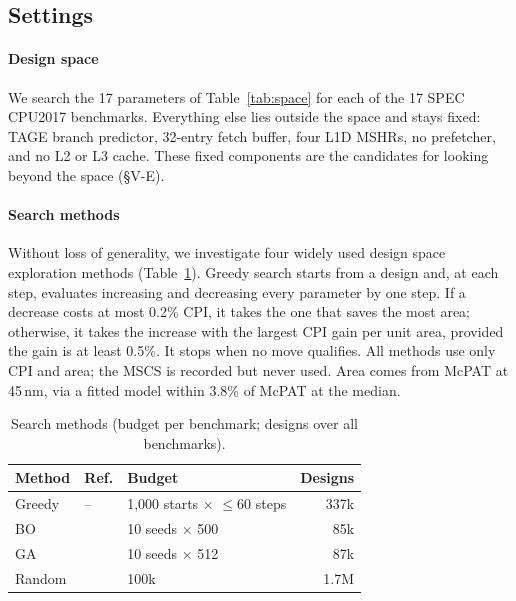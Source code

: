 
\subsection{Settings}
\label{sec:char_settings}

\paragraph{Design space}
We search the 17 parameters of Table~\ref{tab:space} for each of the 17 SPEC CPU2017 benchmarks.
%
Everything else lies outside the space and stays fixed: TAGE branch predictor, 32-entry fetch buffer, four L1D MSHRs, no prefetcher, and no L2 or L3 cache.
%
These fixed components are the candidates for looking beyond the space (\S V-E).

\paragraph{Search methods}
Without loss of generality, we investigate four widely used design space exploration methods (Table~\ref{tab:char_methods}).
%
Greedy search starts from a design and, at each step, evaluates increasing and decreasing every parameter by one step.
%
If a decrease costs at most 0.2\% CPI, it takes the one that saves the most area; otherwise, it takes the increase with the largest CPI gain per unit area, provided the gain is at least 0.5\%.
%
It stops when no move qualifies.
%
All methods use only CPI and area; the MSCS is recorded but never used.
%
Area comes from McPAT at 45\,nm, via a fitted model within 3.8\% of McPAT at the median.

\begin{table}[t]
\centering
\caption{Search methods (budget per benchmark; designs over all benchmarks).}
\label{tab:char_methods}
\footnotesize
\setlength{\tabcolsep}{4pt}
\begin{tabular}{lll r}
\toprule
Method & Ref. & Budget & Designs \\
\midrule
Greedy & -- & 1,000 starts $\times$ $\leq$60 steps & 337k \\
BO & \cite{bo} & 10 seeds $\times$ 500 & 85k \\
GA & \cite{archgym} & 10 seeds $\times$ 512 & 87k \\
Random & \cite{archgym} & 100k & 1.7M \\
\bottomrule
\end{tabular}
\end{table}

